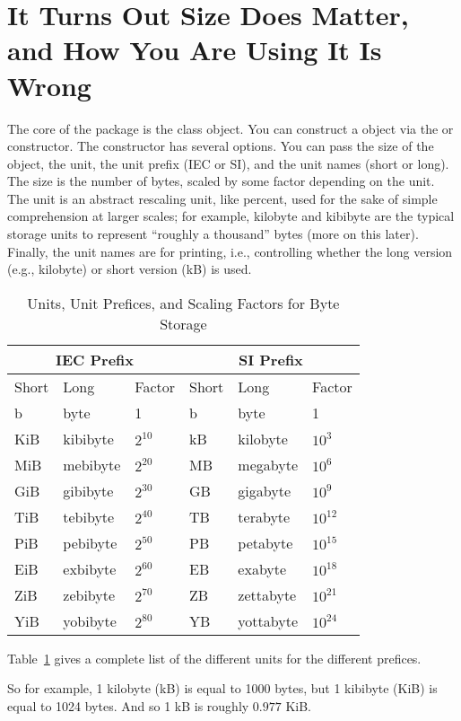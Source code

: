 \section{It Turns Out Size Does Matter, and How You Are Using It Is Wrong}
The core of the  package is the  class object.  You can construct a  object via the  or  constructor.  The constructor has several options.  You can pass the size of the object, the unit, the unit prefix (IEC or SI), and the unit names (short or long).  The size is the number of bytes, scaled by some factor depending on the unit.  The unit is an abstract rescaling unit, like percent, used for the sake of simple comprehension at larger scales; for example, kilobyte and kibibyte are the typical storage units to represent ``roughly a thousand'' bytes (more on this later).  Finally, the unit names are for printing, i.e., controlling whether the long version (e.g., kilobyte) or short version (kB) is used.
\begin{table}[ht]
  \centering
  \begin{tabular}{|lll|lll|}\hline
    \multicolumn{3}{|c}{IEC Prefix} & \multicolumn{3}{|c|}{SI Prefix} \\\hline
    Short & Long & Factor & Short & Long & Factor\\\hline
    b & byte & 1 & b & byte & 1\\
    KiB & kibibyte & $2^{10}$ & kB & kilobyte & $10^3$\\
    MiB & mebibyte & $2^{20}$ & MB & megabyte & $10^6$\\
    GiB & gibibyte & $2^{30}$ & GB & gigabyte & $10^9$\\
    TiB & tebibyte & $2^{40}$ & TB & terabyte & $10^{12}$\\
    PiB & pebibyte & $2^{50}$ & PB & petabyte & $10^{15}$\\
    EiB & exbibyte & $2^{60}$ & EB & exabyte & $10^{18}$\\
    ZiB & zebibyte & $2^{70}$ & ZB & zettabyte & $10^{21}$\\
    YiB & yobibyte & $2^{80}$ & YB & yottabyte & $10^{24}$\\\hline
  \end{tabular}
  \caption{Units, Unit Prefices, and Scaling Factors for Byte Storage}
  \label{tab:units}
\end{table}
Table~\ref{tab:units} gives a complete list of the different units for the different prefices.

So for example, 1 kilobyte (kB) is equal to 1000 bytes, but 1 kibibyte (KiB) is equal to 1024 bytes.  And so 1 kB is roughly $0.977$ KiB.

